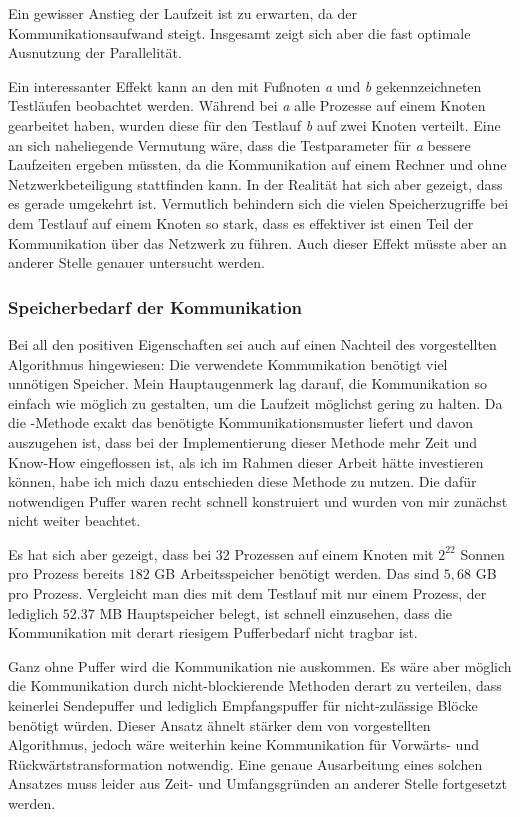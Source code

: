   Ein gewisser Anstieg der Laufzeit ist zu erwarten, da der Kommunikationsaufwand steigt. Insgesamt zeigt sich aber die fast optimale Ausnutzung der Parallelität.
  
  Ein interessanter Effekt kann an den mit Fußnoten \textit{a} und \textit{b} gekennzeichneten Testläufen beobachtet werden. Während bei \textit{a} alle Prozesse auf einem Knoten gearbeitet haben, 
  wurden diese für den Testlauf \textit{b} auf zwei Knoten verteilt. Eine an sich naheliegende Vermutung wäre, dass die Testparameter für \textit{a} bessere Laufzeiten ergeben müssten,
  da die Kommunikation auf einem Rechner und ohne Netzwerkbeteiligung stattfinden kann. In der Realität hat sich aber gezeigt, dass es gerade umgekehrt ist. Vermutlich behindern sich die vielen 
  Speicherzugriffe bei dem Testlauf auf einem Knoten so stark, dass es effektiver ist einen Teil der Kommunikation über das Netzwerk zu führen. Auch dieser Effekt müsste aber an anderer Stelle 
  genauer untersucht werden.
  
  \clearpage
  
  \subsubsection{Speicherbedarf der Kommunikation}
  Bei all den positiven Eigenschaften sei auch auf einen Nachteil des vorgestellten Algorithmus hingewiesen: Die verwendete Kommunikation benötigt viel unnötigen Speicher. Mein Hauptaugenmerk lag
  darauf, die Kommunikation so einfach wie möglich zu gestalten, um die Laufzeit möglichst gering zu halten. Da die -Methode exakt das benötigte Kommunikationsmuster liefert
  und davon auszugehen ist, dass bei der Implementierung dieser Methode mehr Zeit und Know-How eingeflossen ist, als ich im Rahmen dieser Arbeit hätte investieren können, habe ich mich dazu entschieden
  diese Methode zu nutzen. Die dafür notwendigen Puffer waren recht schnell konstruiert und wurden von mir zunächst nicht weiter beachtet. 
  
  Es hat sich aber gezeigt, dass bei 32 Prozessen auf einem Knoten mit $2^{22}$ Sonnen pro Prozess bereits $182$ GB Arbeitsspeicher benötigt werden. Das sind $5,68$ GB pro Prozess. Vergleicht man dies
  mit dem Testlauf mit nur einem Prozess, der lediglich $52.37$ MB Hauptspeicher belegt, ist schnell einzusehen, dass die Kommunikation mit derart riesigem Pufferbedarf nicht tragbar ist.
  
  Ganz ohne Puffer wird die Kommunikation nie auskommen. Es wäre aber möglich die Kommunikation durch nicht-blockierende Methoden derart zu verteilen, dass keinerlei Sendepuffer und lediglich 
  Empfangspuffer für nicht-zulässige Blöcke benötigt würden. Dieser Ansatz ähnelt stärker dem von \citet{distrh2} vorgestellten Algorithmus, jedoch wäre weiterhin keine Kommunikation für Vorwärts- und 
  Rückwärtstransformation notwendig. Eine genaue Ausarbeitung eines solchen Ansatzes muss leider aus Zeit- und Umfangsgründen an anderer Stelle fortgesetzt werden.
  
  